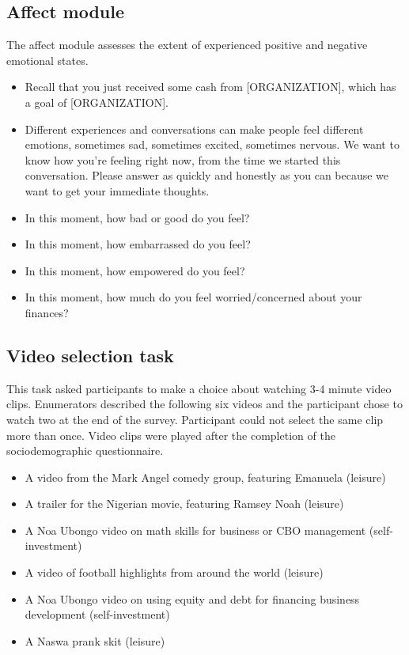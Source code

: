\documentclass[11pt, a4paper]{article}\usepackage[]{graphicx}\usepackage[]{color}
\begin{document}
    \subsection{Affect module}

        The affect module assesses the extent of experienced positive and negative emotional states.

        \begin{itemize}
        \itemsep0em
            \item Recall that you just received some cash from [ORGANIZATION], which has a goal of [ORGANIZATION].
            \item Different experiences and conversations can make people feel different emotions, sometimes sad, sometimes excited, sometimes nervous. We want to know how you're feeling right now, from the time we started this conversation. Please answer as quickly and honestly as you can because we want to get your immediate thoughts.
            \item In this moment, how bad or good do you feel?
            \item In this moment, how embarrassed do you feel?
            \item In this moment, how empowered do you feel?
            \item In this moment, how much do you feel worried/concerned about your finances?
        \end{itemize}

    \subsection{Video selection task}

        This task asked participants to make a choice about watching 3-4 minute video clips. Enumerators described the following six videos and the participant chose to watch two at the end of the survey. Participant could not select the same clip more than once. Video clips were played after the completion of the sociodemographic questionnaire.

        \begin{itemize}
        \itemsep0em
            \item A video from the Mark Angel comedy group, featuring Emanuela (leisure)
            \item A trailer for the Nigerian movie, featuring Ramsey Noah (leisure)
            \item A Noa Ubongo video on math skills for business or CBO management (self-investment)
            \item A video of football highlights from around the world (leisure)
            \item A Noa Ubongo video on using equity and debt for financing business development (self-investment)
            \item A Naswa prank skit (leisure)
        \end{itemize}
\end{document}
